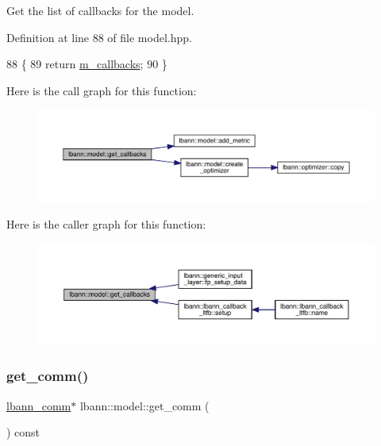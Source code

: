 Get the list of callbacks for the model. 

Definition at line 88 of file model.\+hpp.


\begin{DoxyCode}
88                                                       \{
89     \textcolor{keywordflow}{return} \hyperlink{classlbann_1_1model_a07b511fef30368494c2ad80922ffd0eb}{m\_callbacks};
90   \}
\end{DoxyCode}
Here is the call graph for this function\+:\nopagebreak
\begin{figure}[H]
\begin{center}
\leavevmode
\includegraphics[width=350pt]{classlbann_1_1model_a38c71a455870e087c4c07acb78e4477c_cgraph}
\end{center}
\end{figure}
Here is the caller graph for this function\+:\nopagebreak
\begin{figure}[H]
\begin{center}
\leavevmode
\includegraphics[width=350pt]{classlbann_1_1model_a38c71a455870e087c4c07acb78e4477c_icgraph}
\end{center}
\end{figure}
\mbox{\label{classlbann_1_1model_a9e1cfe449d2f4858a32994f6be0042fb}} 
\subsubsection{\texorpdfstring{get\+\_\+comm()}{get\_comm()}}
{\footnotesize\ttfamily \hyperlink{classlbann_1_1lbann__comm}{lbann\+\_\+comm}$\ast$ lbann\+::model\+::get\+\_\+comm (\begin{DoxyParamCaption}{ }\end{DoxyParamCaption}) const\hspace{0.3cm}{\ttfamily [inline]}}


